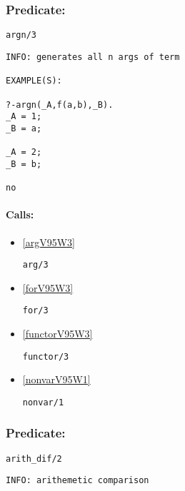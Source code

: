 \subsubsection{Predicate:} \label{argnV95W3}

\begin{verbatim}
argn/3
\end{verbatim}

{\small \begin{verbatim}
INFO: generates all n args of term

EXAMPLE(S):

?-argn(_A,f(a,b),_B).
_A = 1;
_B = a;

_A = 2;
_B = b;

no

\end{verbatim}}
\paragraph{Calls:} 
\begin{itemize}
\item \ref{argV95W3} 
\begin{verbatim}
arg/3
\end{verbatim}

\item \ref{forV95W3} 
\begin{verbatim}
for/3
\end{verbatim}

\item \ref{functorV95W3} 
\begin{verbatim}
functor/3
\end{verbatim}

\item \ref{nonvarV95W1} 
\begin{verbatim}
nonvar/1
\end{verbatim}

\end{itemize}

\subsubsection{Predicate:} \label{arithV95WdifV95W2}

\begin{verbatim}
arith_dif/2
\end{verbatim}

{\small \begin{verbatim}
INFO: arithemetic comparison

\end{verbatim}}
